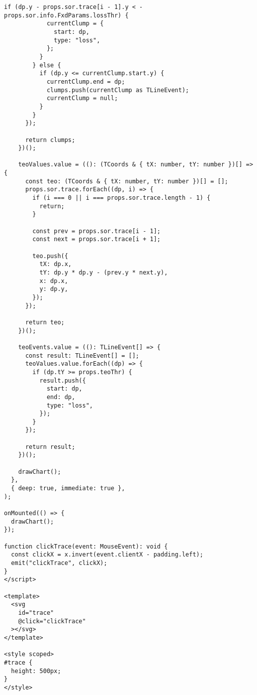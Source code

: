 \begin{lstlisting}[language=vue]
          if (dp.y - props.sor.trace[i - 1].y < -props.sor.info.FxdParams.lossThr) {
            currentClump = {
              start: dp,
              type: "loss",
            };
          }
        } else {
          if (dp.y <= currentClump.start.y) {
            currentClump.end = dp;
            clumps.push(currentClump as TLineEvent);
            currentClump = null;
          }
        }
      });

      return clumps;
    })();

    teoValues.value = ((): (TCoords & { tX: number, tY: number })[] => {
      const teo: (TCoords & { tX: number, tY: number })[] = [];
      props.sor.trace.forEach((dp, i) => {
        if (i === 0 || i === props.sor.trace.length - 1) {
          return;
        }

        const prev = props.sor.trace[i - 1];
        const next = props.sor.trace[i + 1];

        teo.push({
          tX: dp.x,
          tY: dp.y * dp.y - (prev.y * next.y),
          x: dp.x,
          y: dp.y,
        });
      });

      return teo;
    })();

    teoEvents.value = ((): TLineEvent[] => {
      const result: TLineEvent[] = [];
      teoValues.value.forEach((dp) => {
        if (dp.tY >= props.teoThr) {
          result.push({
            start: dp,
            end: dp,
            type: "loss",
          });
        }
      });

      return result;
    })();

    drawChart();
  },
  { deep: true, immediate: true },
);

onMounted(() => {
  drawChart();
});

function clickTrace(event: MouseEvent): void {
  const clickX = x.invert(event.clientX - padding.left);
  emit("clickTrace", clickX);
}
</script>

<template>
  <svg
    id="trace"
    @click="clickTrace"
  ></svg>
</template>

<style scoped>
#trace {
  height: 500px;
}
</style>  
\end{lstlisting}
